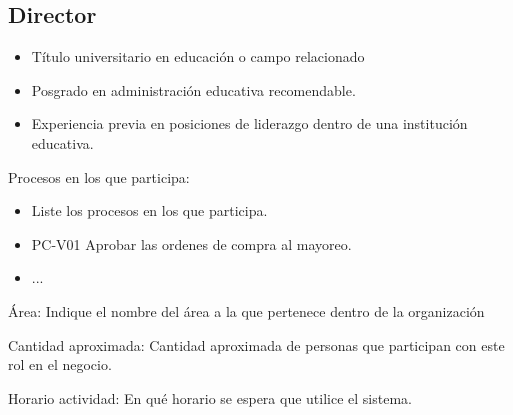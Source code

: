 \begin{Usuario}{\hypertarget{Director}{\subsection{Director}}}
\begin{itemize}
        \item Título universitario en educación o campo relacionado
        \item Posgrado en administración educativa recomendable.
        \item Experiencia previa en posiciones de liderazgo dentro de una institución educativa.
		\end{itemize}
		\item[Procesos en los que participa:] \cdtEmpty
		\begin{itemize}
			\item Liste los procesos en los que participa.
			\item PC-V01 Aprobar las ordenes de compra al mayoreo.
			\item ...
		\end{itemize}
		\item[Área:] Indique el nombre del área a la que pertenece dentro de la organización
		\item[Cantidad aproximada:] Cantidad aproximada de personas que participan con este rol en el negocio.
		\item[Horario actividad:] En qué horario se espera que utilice el sistema. 
	\end{Usuario}
 
